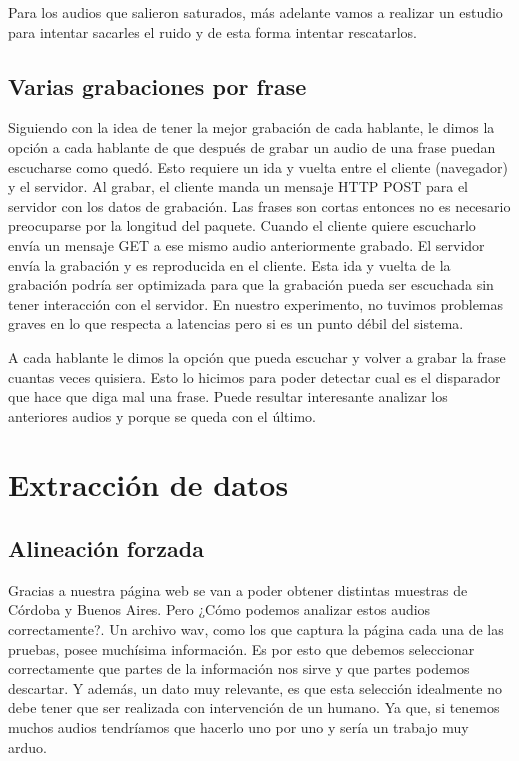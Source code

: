 \documentclass[11pt,a4paper,twoside]{tesis}
\begin{document}
Para los audios que salieron saturados, más adelante vamos a realizar un estudio para intentar sacarles el ruido y de esta forma intentar rescatarlos.

\section{Varias grabaciones por frase}

Siguiendo con la idea de tener la mejor grabación de cada hablante, le dimos la opción a cada hablante de que después de grabar un audio de una frase puedan escucharse como quedó. Esto requiere un ida y vuelta entre el cliente (navegador) y el servidor. Al grabar, el cliente manda un mensaje HTTP POST para el servidor con los datos de grabación. Las frases son cortas entonces no es necesario preocuparse por la longitud del paquete. Cuando el cliente quiere escucharlo envía un mensaje GET a ese mismo audio anteriormente grabado. El servidor envía la grabación y es reproducida en el cliente. Esta ida y vuelta de la grabación podría ser optimizada para que la grabación pueda ser escuchada sin tener interacción con el servidor. En nuestro experimento, no tuvimos problemas graves en lo que respecta a latencias pero si es un punto débil del sistema.

A cada hablante le dimos la opción que pueda escuchar y volver a grabar la frase cuantas veces quisiera. Esto lo hicimos para poder detectar cual es el disparador que hace que diga mal una frase. Puede resultar interesante analizar los anteriores audios y porque se queda con el último.

\chapter{Extracción de datos}

\section{Alineación forzada}

Gracias a nuestra página web se van a poder obtener distintas muestras de Córdoba y Buenos Aires. Pero ¿Cómo podemos analizar estos audios correctamente?. Un archivo wav, como los que captura la página cada una de las pruebas, posee muchísima información. Es por esto que debemos seleccionar correctamente que partes de la información nos sirve y que partes podemos descartar. Y además, un dato muy relevante, es que esta selección idealmente no debe tener que ser realizada con intervención de un humano. Ya que, si tenemos muchos audios tendríamos que hacerlo uno por uno y sería un trabajo muy arduo.
\end{document}
